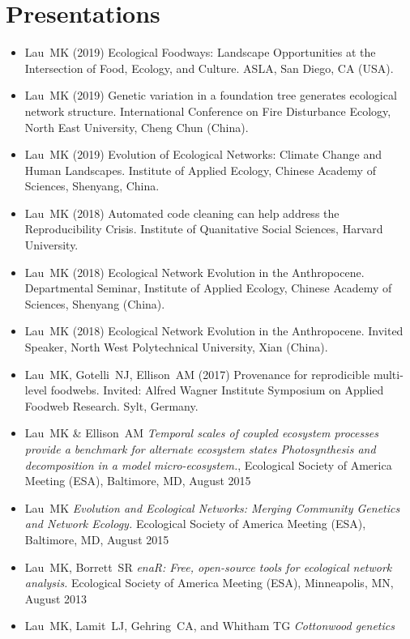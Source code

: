 \documentclass[a4paper]{article}
\begin{document}
\section{Presentations}\label{presentations}

\begin{itemize}
\item Lau~MK (2019) Ecological Foodways: Landscape Opportunities at
  the Intersection of Food, Ecology, and Culture. ASLA, San Diego, CA
  (USA).
\item Lau~MK (2019) Genetic variation in a foundation tree generates
  ecological network structure. International Conference on Fire
  Disturbance Ecology, North East University, Cheng Chun (China).
\item Lau~MK (2019) Evolution of Ecological Networks: Climate Change
  and Human Landscapes. Institute of Applied Ecology, Chinese Academy
  of Sciences, Shenyang, China.
\item Lau~MK (2018) Automated code cleaning can help address the
  Reproducibility Crisis. Institute of Quanitative Social Sciences,
  Harvard University.
\item Lau~MK (2018) Ecological Network Evolution in the
  Anthropocene. Departmental Seminar, Institute of Applied Ecology,
  Chinese Academy of Sciences, Shenyang (China).
\item Lau~MK (2018) Ecological Network Evolution in the
  Anthropocene. Invited Speaker, North West Polytechnical University,
  Xian (China).
\item Lau~MK, Gotelli~NJ, Ellison~AM (2017) Provenance for
  reprodicible multi-level foodwebs. Invited: Alfred Wagner Institute
  Symposium on Applied Foodweb Research. Sylt, Germany. 
\item Lau~MK \& Ellison~AM \emph{Temporal scales of coupled ecosystem
  processes provide a benchmark for alternate ecosystem states
  Photosynthesis and decomposition in a model micro-ecosystem.},
  Ecological Society of America Meeting (ESA), Baltimore, MD, August
  2015
\item Lau~MK \emph{Evolution and Ecological Networks: Merging
  Community Genetics and Network Ecology.} Ecological Society of
  America Meeting (ESA), Baltimore, MD, August 2015
\item
  Lau~MK, Borrett~SR \emph{enaR: Free, open-source tools for ecological
  network analysis.} Ecological Society of America Meeting (ESA),
  Minneapolis, MN, August 2013
\item
  Lau~MK, Lamit~LJ, Gehring~CA, and Whitham TG \emph{Cottonwood genetics
}
\end{itemize}
\end{document}
